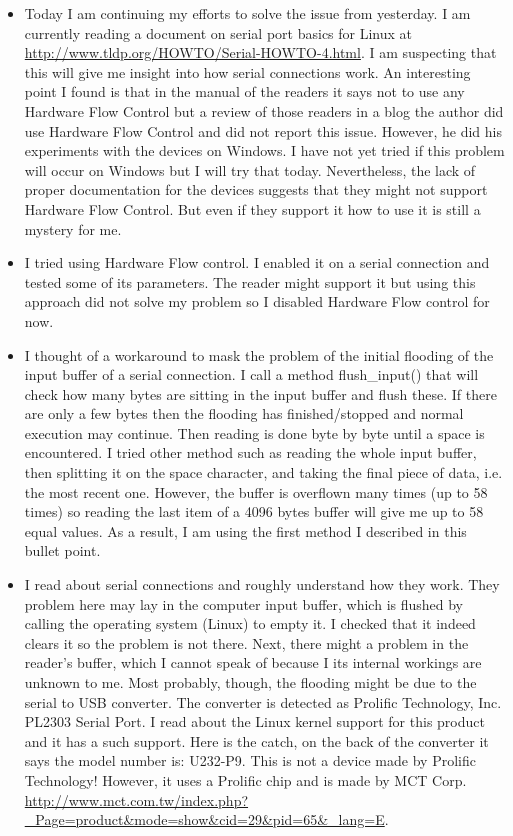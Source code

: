 \documentclass[a4paper,12pt]{article}
\begin{document}
\begin{itemize}
	\item Today I am continuing my efforts to solve the issue from yesterday. I am currently reading a document on serial port basics for Linux at \url{http://www.tldp.org/HOWTO/Serial-HOWTO-4.html}. I am suspecting that this will give me insight into how serial connections work. An interesting point I found is that in the manual of the readers it says not to use any Hardware Flow Control but a review of those readers in a blog the author did use Hardware Flow Control and did not report this issue. However, he did his experiments with the devices on Windows. I have not yet tried if this problem will occur on Windows but I will try that today. Nevertheless, the lack of proper documentation for the devices suggests that they might not support Hardware Flow Control. But even if they support it how to use it is still a mystery for me.
	\item I tried using Hardware Flow control. I enabled it on a serial connection and tested some of its parameters. The reader might support it but using this approach did not solve my problem so I disabled Hardware Flow control for now.
	\item I thought of a workaround to mask the problem of the initial flooding of the input buffer of a serial connection. I call a method \textsf{flush\_input()} that will check how many bytes are sitting in the input buffer and flush these. If there are only a few bytes then the flooding has finished/stopped and normal execution may continue. Then reading is done byte by byte until a space is encountered. I tried other method such as reading the whole input buffer, then splitting it on the space character, and taking the final piece of data, i.e. the most recent one. However, the buffer is overflown many times (up to 58 times) so reading the last item of a 4096 bytes buffer will give me up to 58 equal values. As a result, I am using the first method I described in this bullet point.
	\item I read about serial connections and roughly understand how they work. They problem here may lay in the computer input buffer, which is flushed by calling the operating system (Linux) to empty it. I checked that it indeed clears it so the problem is not there. Next, there might a problem in the reader's buffer, which I cannot speak of because I its internal workings are unknown to me. Most probably, though, the flooding might be due to the serial to USB converter. The converter is detected as Prolific Technology, Inc. PL2303 Serial Port. I read about the Linux kernel support for this product and it has a such support. Here is the catch, on the back of the converter it says the model number is: U232-P9. This is not a device made by Prolific Technology! However, it uses a Prolific chip and is made by MCT Corp. \url{http://www.mct.com.tw/index.php?_Page=product&mode=show&cid=29&pid=65&_lang=E}.	

\end{itemize}
\end{document}
